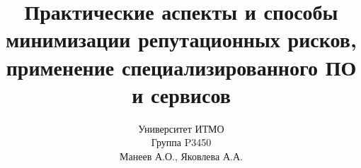 \title{Практические аспекты и способы минимизации репутационных рисков, применение специализированного ПО и сервисов}
	\author{Университет ИТМО\\
		Группа P3450\\
		Манеев А.О., Яковлева А.А.\\
		}
	\date{}
\maketitle
